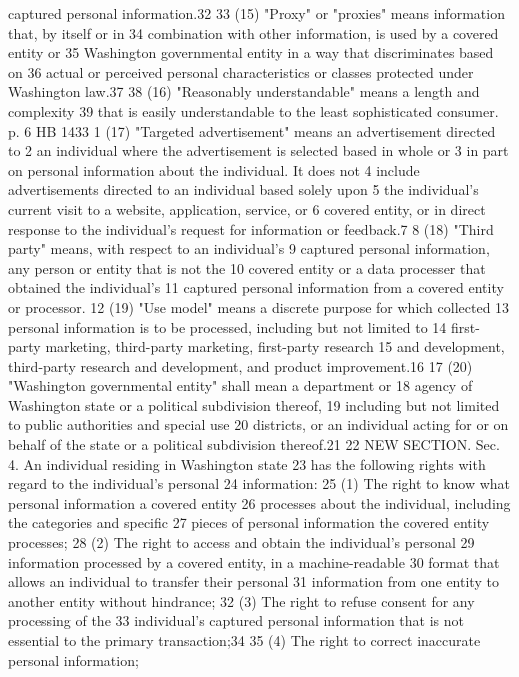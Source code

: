 captured personal information.32
33 (15) "Proxy" or "proxies" means information that, by itself or in
34 combination with other information, is used by a covered entity or
35 Washington governmental entity in a way that discriminates based on
36 actual or perceived personal characteristics or classes protected
under Washington law.37
38 (16) "Reasonably understandable" means a length and complexity
39 that is easily understandable to the least sophisticated consumer.
p. 6 HB 1433
1 (17) "Targeted advertisement" means an advertisement directed to
2 an individual where the advertisement is selected based in whole or
3 in part on personal information about the individual. It does not
4 include advertisements directed to an individual based solely upon
5 the individual's current visit to a website, application, service, or
6 covered entity, or in direct response to the individual's request for
information or feedback.7
8 (18) "Third party" means, with respect to an individual's
9 captured personal information, any person or entity that is not the
10 covered entity or a data processer that obtained the individual's
11 captured personal information from a covered entity or processor.
12 (19) "Use model" means a discrete purpose for which collected
13 personal information is to be processed, including but not limited to
14 first-party marketing, third-party marketing, first-party research
15 and development, third-party research and development, and product
improvement.16
17 (20) "Washington governmental entity" shall mean a department or
18 agency of Washington state or a political subdivision thereof,
19 including but not limited to public authorities and special use
20 districts, or an individual acting for or on behalf of the state or a
political subdivision thereof.21
22 NEW SECTION. Sec. 4. An individual residing in Washington state
23 has the following rights with regard to the individual's personal
24 information:
25 (1) The right to know what personal information a covered entity
26 processes about the individual, including the categories and specific
27 pieces of personal information the covered entity processes;
28 (2) The right to access and obtain the individual's personal
29 information processed by a covered entity, in a machine-readable
30 format that allows an individual to transfer their personal
31 information from one entity to another entity without hindrance;
32 (3) The right to refuse consent for any processing of the
33 individual's captured personal information that is not essential to
the primary transaction;34
35 (4) The right to correct inaccurate personal information;
